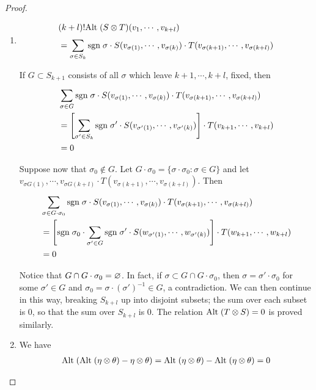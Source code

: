 \begin{proof}
    \begin{enumerate}[label=(\arabic*)]
        \item \;\vspace*{-2em}
            \begin{align*}
                & (k+l)!\mathrm{Alt}\;(S\otimes T)(v_1, \cdots, v_{k+l}) \\
                & = \sum_{\sigma\in S_k}^{}{\mathrm{sgn}\;\sigma\cdot S(v_{\sigma(1)}, \cdots, v_{\sigma(k)})\cdot T(v_{\sigma(k+1)}, \cdots, v_{\sigma(k+l)})}
            \end{align*}

            If $G\subset S_{k+1}$ consists of all $\sigma$ which leave $k+1, \cdots, k+l$, fixed, then 
            \begin{align*}
                & \sum_{\sigma\in G}^{}{\mathrm{sgn}\;\sigma\cdot S(v_{\sigma(1)}, \cdots, v_{\sigma(k)})\cdot T(v_{\sigma(k+1)}, \cdots, v_{\sigma(k+l)})} \\
                & = \left[\sum_{\sigma'\in S_k}^{}{\mathrm{sgn}\;\sigma'\cdot S(v_{\sigma'(1)}, \cdots, v_{\sigma'(k)})}\right]
                    \cdot T(v_{k+1}, \cdots, v_{k+l}) \\
                & = 0
            \end{align*} 

            Suppose now that $\sigma_0\notin G$. Let $G\cdot \sigma_0=\{\sigma\cdot\sigma_0:\sigma\in G\}$ and let 
            $v_{\sigma G(1)}, \cdots, v_{\sigma G(k+l)}\cdot T(v_{\sigma(k+1)}, \cdots, v_{\sigma(k+l)})$. Then 
            \begin{align*}
                & \sum_{\sigma\in G\cdot\sigma_0}^{} \mathrm{sgn}\;\sigma\cdot S(v_{\sigma(1)}, \cdots, v_{\sigma(k)})\cdot T(v_{\sigma(k+1)}, \cdots, v_{\sigma(k+l)}) \\
                & = \left[\mathrm{sgn}\;\sigma_0\cdot\sum_{\sigma'\in G}^{}{\mathrm{sgn}\;\sigma'\cdot S(w_{\sigma'(1)}, \cdots, w_{\sigma'(k)})}\right]\cdot T(w_{k+1}, \cdots, w_{k+l}) \\
                & = 0
            \end{align*}

            Notice that $G\cap G\cdot \sigma_0=\varnothing$. In fact, if $\sigma\subset G\cap G\cdot\sigma_0$,
            then $\sigma=\sigma'\cdot\sigma_0$ for some $\sigma'\in G$ and $\sigma_0=\sigma\cdot (\sigma')^{-1}\in G$,
            a contradiction. We can then continue in this way, breaking $S_{k+l}$ up into disjoint subsets; the 
            sum over each subset is 0, so that the sum over $S_{k+l}$ is 0. The relation $\mathrm{Alt}\;(T\otimes S)=0$ is 
            proved similarly.
        \item We have 
            \begin{align*}
                \mathrm{Alt}\;(\mathrm{Alt}\;(\eta\otimes\theta) - \eta\otimes\theta) 
                = \mathrm{Alt}\;(\eta\otimes\theta) - \mathrm{Alt}\;(\eta\otimes\theta)
                = 0
            \end{align*}


\end{enumerate}
\end{proof}
